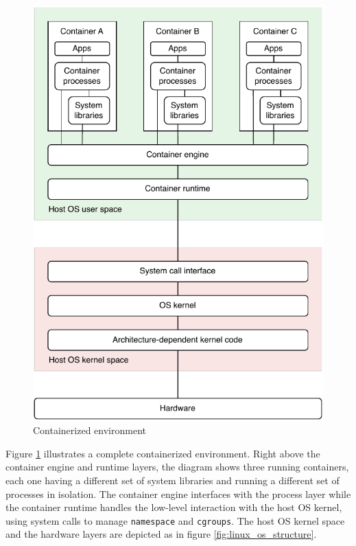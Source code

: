 \begin{figure}[htbp]
    \vspace{10pt}
    \centering
    \includegraphics{assets/containerization.pdf}
    \caption{Containerized environment}
    \label{fig:containers}
    \vspace{10pt}
\end{figure}

\newpage
Figure \ref{fig:containers} illustrates a complete containerized environment.
Right above the container engine and runtime layers, the diagram shows three running containers, each one having a different set of system libraries and running a different set of processes in isolation. 
The container engine interfaces with the process layer while the container runtime handles the low-level interaction with the host OS kernel, using system calls to manage \texttt{namespace} and \texttt{cgroups}. 
The host OS kernel space and the hardware layers are depicted as in figure \ref{fig:linux_os_structure}. 

